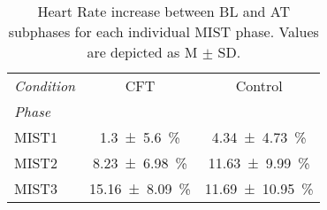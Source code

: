 \begin{table}[h!]
\centering
\caption{Heart Rate increase between BL and AT subphases for each individual MIST phase. Values are depicted as M $\pm$ SD.}
\begin{tabular}{l|SS}
\toprule
\textit{Condition} & CFT & Control \\
\textit{Phase} &  &  \\
\midrule
MIST1 & \SI{1.3 \pm 5.6}{\percent} & \SI{4.34 \pm 4.73}{\percent} \\
MIST2 & \SI{8.23 \pm 6.98}{\percent} & \SI{11.63 \pm 9.99}{\percent} \\
MIST3 & \SI{15.16 \pm 8.09}{\percent} & \SI{11.69 \pm 10.95}{\percent} \\
\bottomrule
\end{tabular}
\end{table}
